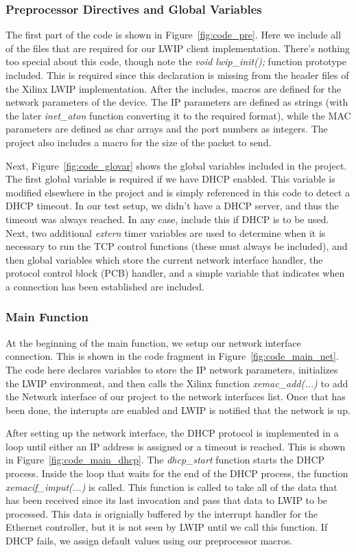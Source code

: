 \documentclass[11pt]{article}
\begin{document}
\subsubsection*{Preprocessor Directives and Global Variables}
The first part of the code is shown in Figure~\ref{fig:code_pre}. Here we include all of the files that are required for our LWIP client implementation. There's nothing too special about this code, though note the \textit{void lwip\_init();} function prototype included. This is required since this declaration is missing from the header files of the Xilinx LWIP implementation. After the includes, macros are defined for the network parameters of the device. The IP parameters are defined as strings (with the later \textit{inet\_aton} function converting it to the required format), while the MAC parameters are defined as char arrays and the port numbers as integers. The project also includes a macro for the size of the packet to send.

Next, Figure~\ref{fig:code_glovar} shows the global variables included in the project. The first global variable is required if we have DHCP enabled. This variable is modified elsewhere in the project and is simply referenced in this code to detect a DHCP timeout. In our test setup, we didn't have a DHCP server, and thus the timeout was always reached. In any case, include this if DHCP is to be used. Next, two additional \textit{extern} timer variables are used to determine when it is necessary to run the TCP control functions (these must always be included), and then global variables which store the current network interface handler, the protocol control block (PCB) handler, and a simple variable that indicates when a connection has been established are included.

\subsubsection*{Main Function}

At the beginning of the main function, we setup our network interface connection. This is shown in the code fragment in Figure~\ref{fig:code_main_net}. The code here declares variables to store the IP network parameters, initializes the LWIP environment, and then calls the Xilinx function \textit{xemac\_add(...)} to add the Network interface of our project to the network interfaces list. Once that has been done, the interupts are enabled and LWIP is notified that the network is up.

After setting up the network interface, the DHCP protocol is implemented in a loop until either an IP address is assigned or a timeout is reached. This is shown in Figure~\ref{fig:code_main_dhcp}. The \textit{dhcp\_start} function starts the DHCP process. Inside the loop that waits for the end of the DHCP process, the function \textit{xemacif\_imput(...)} is called. This function is called to take all of the data that has been received since its last invocation and pass that data to LWIP to be processed. This data is orignially buffered by the interrupt handler for the Ethernet controller, but it is not seen by LWIP until we call this function. If DHCP fails, we assign default values using our preprocessor macros.
\end{document}
